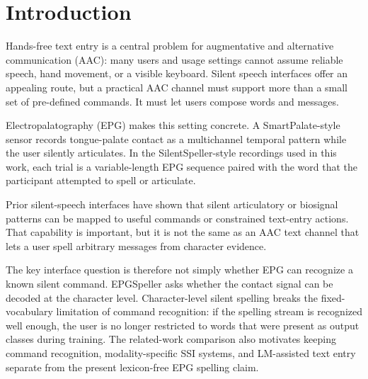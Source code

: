 
\section{Introduction}
Hands-free text entry is a central problem for augmentative and alternative communication (AAC): many users and usage settings cannot assume reliable speech, hand movement, or a visible keyboard. Silent speech interfaces offer an appealing route, but a practical AAC channel must support more than a small set of pre-defined commands. It must let users compose words and messages.


Electropalatography (EPG) makes this setting concrete. A SmartPalate-style sensor records tongue-palate contact as a multichannel temporal pattern while the user silently articulates. In the SilentSpeller-style recordings used in this work, each trial is a variable-length EPG sequence paired with the word that the participant attempted to spell or articulate.


Prior silent-speech interfaces have shown that silent articulatory or biosignal patterns can be mapped to useful commands or constrained text-entry actions. That capability is important, but it is not the same as an AAC text channel that lets a user spell arbitrary messages from character evidence.


The key interface question is therefore not simply whether EPG can recognize a known silent command. EPGSpeller asks whether the contact signal can be decoded at the character level. Character-level silent spelling breaks the fixed-vocabulary limitation of command recognition: if the spelling stream is recognized well enough, the user is no longer restricted to words that were present as output classes during training. The related-work comparison also motivates keeping command recognition, modality-specific SSI systems, and LM-assisted text entry separate from the present lexicon-free EPG spelling claim.


